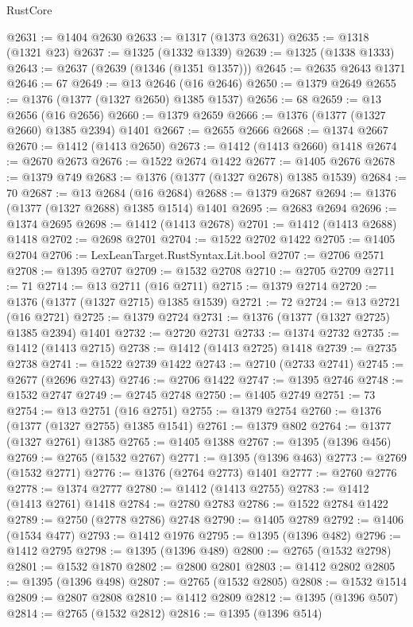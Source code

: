 \begin{lexlean}{RustCore}
\begin{coremodule}
@2631 := @1404 @2630
@2633 := @1317 (@1373 @2631)
@2635 := @1318 (@1321 @23)
@2637 := @1325 (@1332 @1339)
@2639 := @1325 (@1338 @1333)
@2643 := @2637 (@2639 (@1346 (@1351 @1357)))
@2645 := @2635 @2643 @1371
@2646 := 67
@2649 := @13 @2646 (@16 @2646)
@2650 := @1379 @2649
@2655 := @1376 (@1377 (@1327 @2650) @1385 @1537)
@2656 := 68
@2659 := @13 @2656 (@16 @2656)
@2660 := @1379 @2659
@2666 := @1376 (@1377 (@1327 @2660) @1385 @2394) @1401
@2667 := @2655 @2666
@2668 := @1374 @2667
@2670 := @1412 (@1413 @2650)
@2673 := @1412 (@1413 @2660) @1418
@2674 := @2670 @2673
@2676 := @1522 @2674 @1422
@2677 := @1405 @2676
@2678 := @1379 @749
@2683 := @1376 (@1377 (@1327 @2678) @1385 @1539)
@2684 := 70
@2687 := @13 @2684 (@16 @2684)
@2688 := @1379 @2687
@2694 := @1376 (@1377 (@1327 @2688) @1385 @1514) @1401
@2695 := @2683 @2694
@2696 := @1374 @2695
@2698 := @1412 (@1413 @2678)
@2701 := @1412 (@1413 @2688) @1418
@2702 := @2698 @2701
@2704 := @1522 @2702 @1422
@2705 := @1405 @2704
@2706 := LexLeanTarget.RustSyntax.Lit.bool
@2707 := @2706 @2571
@2708 := @1395 @2707
@2709 := @1532 @2708
@2710 := @2705 @2709
@2711 := 71
@2714 := @13 @2711 (@16 @2711)
@2715 := @1379 @2714
@2720 := @1376 (@1377 (@1327 @2715) @1385 @1539)
@2721 := 72
@2724 := @13 @2721 (@16 @2721)
@2725 := @1379 @2724
@2731 := @1376 (@1377 (@1327 @2725) @1385 @2394) @1401
@2732 := @2720 @2731
@2733 := @1374 @2732
@2735 := @1412 (@1413 @2715)
@2738 := @1412 (@1413 @2725) @1418
@2739 := @2735 @2738
@2741 := @1522 @2739 @1422
@2743 := @2710 (@2733 @2741)
@2745 := @2677 (@2696 @2743)
@2746 := @2706 @1422
@2747 := @1395 @2746
@2748 := @1532 @2747
@2749 := @2745 @2748
@2750 := @1405 @2749
@2751 := 73
@2754 := @13 @2751 (@16 @2751)
@2755 := @1379 @2754
@2760 := @1376 (@1377 (@1327 @2755) @1385 @1541)
@2761 := @1379 @802
@2764 := @1377 (@1327 @2761) @1385
@2765 := @1405 @1388
@2767 := @1395 (@1396 @456)
@2769 := @2765 (@1532 @2767)
@2771 := @1395 (@1396 @463)
@2773 := @2769 (@1532 @2771)
@2776 := @1376 (@2764 @2773) @1401
@2777 := @2760 @2776
@2778 := @1374 @2777
@2780 := @1412 (@1413 @2755)
@2783 := @1412 (@1413 @2761) @1418
@2784 := @2780 @2783
@2786 := @1522 @2784 @1422
@2789 := @2750 (@2778 @2786) @2748
@2790 := @1405 @2789
@2792 := @1406 (@1534 @477)
@2793 := @1412 @1976
@2795 := @1395 (@1396 @482)
@2796 := @1412 @2795
@2798 := @1395 (@1396 @489)
@2800 := @2765 (@1532 @2798)
@2801 := @1532 @1870
@2802 := @2800 @2801
@2803 := @1412 @2802
@2805 := @1395 (@1396 @498)
@2807 := @2765 (@1532 @2805)
@2808 := @1532 @1514
@2809 := @2807 @2808
@2810 := @1412 @2809
@2812 := @1395 (@1396 @507)
@2814 := @2765 (@1532 @2812)
@2816 := @1395 (@1396 @514)

\end{coremodule}
\end{lexlean}
